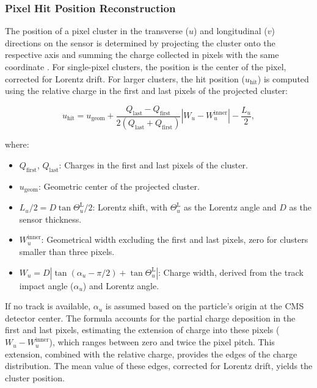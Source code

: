 \subsubsection{Pixel Hit Position Reconstruction}

The position of a pixel cluster in the transverse (\(u\)) and longitudinal (\(v\)) directions on the sensor is determined by projecting the cluster onto the respective axis and summing the charge collected in pixels with the same coordinate \cite{CMS:2014pgm}. For single-pixel clusters, the position is the center of the pixel, corrected for Lorentz drift. For larger clusters, the hit position (\(u_{\text{hit}}\)) is computed using the relative charge in the first and last pixels of the projected cluster:

\begin{equation}
u_{\text{hit}} = u_{\text{geom}} + \frac{Q_{\text{last}} - Q_{\text{first}}}{2(Q_{\text{last}} + Q_{\text{first}})} |W_u - W_u^{\text{inner}}| - \frac{L_u}{2},
\end{equation}

where:
\begin{itemize}
    \item \(Q_{\text{first}}\), \(Q_{\text{last}}\): Charges in the first and last pixels of the cluster.
    \item \(u_{\text{geom}}\): Geometric center of the projected cluster.
    \item \(L_u/2 = D \tan \Theta_u^{\text{L}}/2\): Lorentz shift, with \(\Theta_u^{\text{L}}\) as the Lorentz angle and \(D\) as the sensor thickness.
    \item \(W_u^{\text{inner}}\): Geometrical width excluding the first and last pixels, zero for clusters smaller than three pixels.
    \item \(W_u = D \left| \tan (\alpha_u - \pi/2) + \tan \Theta_u^{\text{L}} \right|\): Charge width, derived from the track impact angle (\(\alpha_u\)) and Lorentz angle.
\end{itemize}

If no track is available, \(\alpha_u\) is assumed based on the particle's origin at the CMS detector center. The formula accounts for the partial charge deposition in the first and last pixels, estimating the extension of charge into these pixels (\(W_u - W_u^{\text{inner}}\)), which ranges between zero and twice the pixel pitch. This extension, combined with the relative charge, provides the edges of the charge distribution. The mean value of these edges, corrected for Lorentz drift, yields the cluster position.

